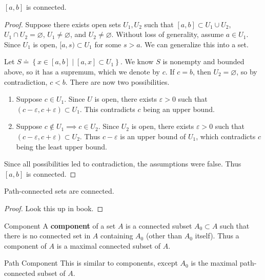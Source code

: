 \documentclass[10pt]{report}
\begin{document}
\begin{prop}
	$[a,b]$ is connected.
\end{prop}
\begin{proof}
	Suppose there exists open sets $U_1,U_2$ such that $[a,b] \subset U_1 \cup U_2$, $U_1 \cap U_2 = \varnothing$, $U_1 \neq \varnothing$, and $U_2 \neq \varnothing$. Without loss of generality, assume $a \in U_1$. Since $U_1$ is open, $[a,s) \subset U_1$ for some $s > a$. We can generalize this into a set.

	Let $S \doteq \left\{ x\in [a,b] \;|\; [a,x] \subset U_1\right\}$. We know $S$ is nonempty and bounded above, so it has a supremum, which we denote by $c$. If $c=b$, then $U_2=\varnothing$, so by contradiction, $c < b$. There are now two possibilities.
	\begin{enumerate}
		\item Suppose $c \in U_1$. Since $U$ is open, there exists $\varepsilon>0$ such that $(c-\varepsilon,c+\varepsilon) \subset U_1$. This contradicts $c$ being an upper bound.
		\item Suppose $c \not\in U_1 \implies c \in U_2$. Since $U_2$ is open, there exists $\varepsilon>0$ such that $(c-\varepsilon,c+\varepsilon) \subset U_2$. Thus $c-\varepsilon$ is an upper bound of $U_1$, which contradicts $c$ being the least upper bound.
	\end{enumerate}
	Since all possibilities led to contradiction, the assumptions were false. Thus $[a,b]$ is connected.
\end{proof}

\begin{thrm}{}{}
Path-connected sets are connected.
\end{thrm}
\begin{proof}
	{\color{red}Look this up in book.}
\end{proof}

\begin{defn}{Component}{}
	A \textbf{component} of a set $A$ is a connected subset $A_0 \subset A$ such that there is no connected set in $A$ containing $A_0$ (other than $A_0$ itself). Thus a component of $A$ is a maximal connected subset of $A$.
\end{defn}

\begin{defn}{Path Component}{}
This is similar to components, except $A_0$ is the maximal path-connected subset of $A$.
\end{defn}


\end{document}
